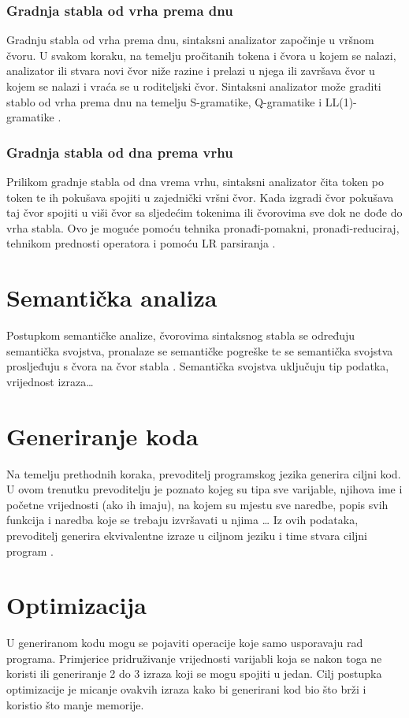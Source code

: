 \documentclass[times, utf8, zavrsni]{fer}
\begin{document}
\subsubsection{Gradnja stabla od vrha prema dnu}
Gradnju stabla od vrha prema dnu, sintaksni analizator započinje u vršnom čvoru. U svakom koraku, na temelju 
pročitanih tokena i čvora u kojem se nalazi, analizator ili stvara novi čvor niže razine i prelazi u njega ili završava čvor u kojem se nalazi
i vraća se u roditeljski čvor. Sintaksni analizator može graditi stablo od vrha prema dnu na temelju S-gramatike,
Q-gramatike i LL(1)-gramatike \citep{ppj}. 

\subsubsection{Gradnja stabla od dna prema vrhu}
Prilikom gradnje stabla od dna vrema vrhu, sintaksni analizator čita token po token te ih pokušava spojiti u zajednički vršni čvor.
Kada izgradi čvor pokušava taj čvor spojiti u viši čvor sa sljedećim tokenima ili čvorovima sve dok ne dođe do vrha stabla.
Ovo je moguće pomoću tehnika pronađi-pomakni, pronađi-reduciraj, tehnikom prednosti operatora i pomoću LR parsiranja \citep{ppj}. 

\section{Semantička analiza}
Postupkom semantičke analize, čvorovima sintaksnog stabla se određuju semantička svojstva, pronalaze se semantičke pogreške
te se semantička svojstva prosljeđuju \linebreak s čvora na čvor stabla \citep{ppj}. Semantička svojstva uključuju tip podatka, vrijednost izraza\dots

\section{Generiranje koda}
Na temelju prethodnih koraka, prevoditelj programskog jezika generira ciljni kod. U ovom trenutku prevoditelju je poznato
kojeg su tipa sve varijable, njihova ime i početne vrijednosti (ako ih imaju), na kojem su mjestu sve naredbe, popis svih funkcija i naredba koje se trebaju izvršavati u njima \dots
Iz ovih podataka, prevoditelj generira ekvivalentne izraze u ciljnom jeziku i time stvara ciljni program \citep{ppj}. 

\section{Optimizacija}
U generiranom kodu mogu se pojaviti operacije koje samo usporavaju rad programa. Primjerice pridruživanje vrijednosti varijabli koja se nakon toga ne koristi
ili generiranje 2 do 3 izraza koji se mogu spojiti u jedan.
Cilj postupka optimizacije je micanje ovakvih izraza kako bi generirani kod bio što brži i koristio što manje memorije.
\end{document}
